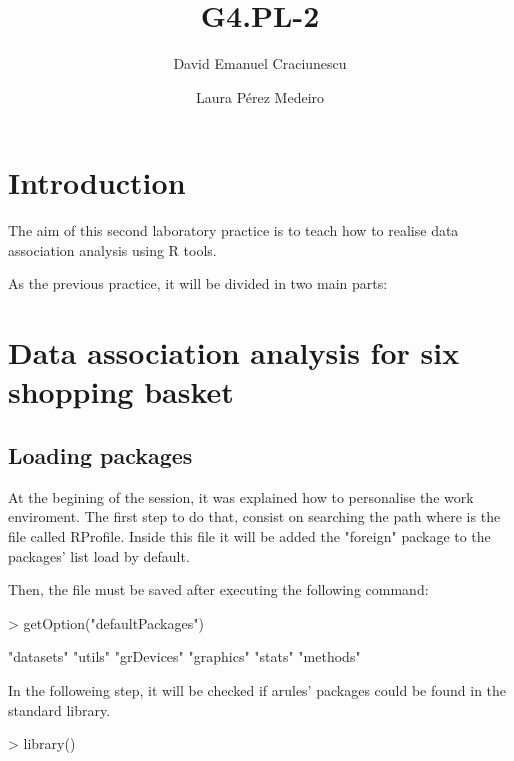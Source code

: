 \documentclass[a4paper]{article}
\begin{document}
\title{G4.PL-2}
\author{David Emanuel Craciunescu \and Laura Pérez Medeiro}


\maketitle


\section*{Introduction}

The aim of this second laboratory practice is to teach how to realise data association analysis using
R tools.

As the previous practice, it will be divided in two main parts:


\section*{Data association analysis for six shopping basket}

	\subsection*{Loading packages}

At the begining of the session, it was explained how to personalise the work enviroment. The first step
to do that, consist on searching the path where is the file called RProfile. Inside this file it will be
added the "foreign" package to the packages' list load by default.

Then, the file must be saved after executing the following command:
\begin{Schunk}
\begin{Sinput}
> getOption("defaultPackages")
\end{Sinput}
\begin{Soutput}
[1] "datasets"  "utils"     "grDevices" "graphics"  "stats"     "methods"  
\end{Soutput}
\end{Schunk}
In the followeing step, it will be checked if arules' packages could be found in the standard library.
\begin{Schunk}
\begin{Sinput}
> library()
\end{Sinput}
\end{Schunk}
\end{document}

